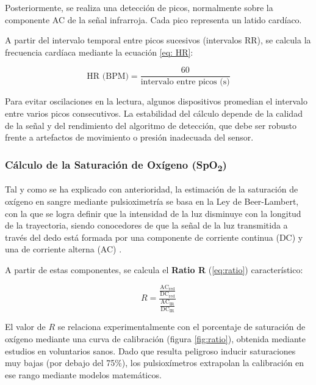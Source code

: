 Posteriormente, se realiza una detección de picos, normalmente sobre la componente AC de la señal infrarroja. Cada pico representa un latido cardíaco. 

A partir del intervalo temporal entre picos sucesivos (intervalos RR), se calcula la frecuencia cardíaca mediante la ecuación \ref{eq: HR}:

\begin{equation}
\text{HR (BPM)} = \frac{60}{\text{intervalo entre picos (s)}}
\label{eq: HR}
\end{equation}



Para evitar oscilaciones en la lectura, algunos dispositivos promedian el intervalo entre varios picos consecutivos. La estabilidad del cálculo depende de la calidad de la señal y del rendimiento del algoritmo de detección, que debe ser robusto frente a artefactos de movimiento o presión inadecuada del sensor.

\subsubsection{Cálculo de la Saturación de Oxígeno (SpO\textsubscript{2})}

Tal y como se ha explicado con anterioridad, la estimación de la saturación de oxígeno en sangre mediante pulsioximetría se basa en la Ley de Beer-Lambert, con la que se logra definir que la intensidad de la luz disminuye con la longitud de la trayectoria, siendo conocedores de que la señal de la luz transmitida a través del dedo está formada por una componente de corriente continua (DC) y una de corriente alterna (AC) \cite{liu2021wearable}. 

A partir de estas componentes, se calcula el \textbf{Ratio R} (\ref{eq:ratio}) característico:

\begin{equation}
    R = \frac{\frac{\mathrm{AC}_{\text{red}}}{\mathrm{DC}_{\text{red}}}}{\frac{\mathrm{AC}_{\text{IR}}}{\mathrm{DC}_{\text{IR}}}}
    \label{eq:ratio}
\end{equation}

El valor de \( R \) se relaciona experimentalmente con el porcentaje de saturación de oxígeno mediante una curva de calibración (figura \ref{fig:ratio}), obtenida mediante estudios en voluntarios sanos. Dado que resulta peligroso inducir saturaciones muy bajas (por debajo del 75\%), los pulsioxímetros extrapolan la calibración en ese rango mediante modelos matemáticos.

